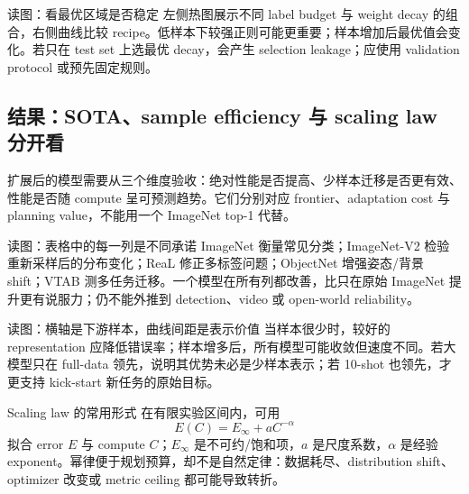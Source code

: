 \begin{knowledgebox}{读图：看最优区域是否稳定}
左侧热图展示不同 label budget 与 weight decay 的组合，右侧曲线比较 recipe。低样本下较强正则可能更重要；样本增加后最优值会变化。若只在 test set 上选最优 decay，会产生 selection leakage；应使用 validation protocol 或预先固定规则。
\end{knowledgebox}

\subsection{结果：SOTA、sample efficiency 与 scaling law 分开看}

扩展后的模型需要从三个维度验收：绝对性能是否提高、少样本迁移是否更有效、性能是否随 compute 呈可预测趋势。它们分别对应 frontier、adaptation cost 与 planning value，不能用一个 ImageNet top-1 代替。


\begin{knowledgebox}{读图：表格中的每一列是不同承诺}
ImageNet 衡量常见分类；ImageNet-V2 检验重新采样后的分布变化；ReaL 修正多标签问题；ObjectNet 增强姿态/背景 shift；VTAB 测多任务迁移。一个模型在所有列都改善，比只在原始 ImageNet 提升更有说服力；仍不能外推到 detection、video 或 open-world reliability。
\end{knowledgebox}


\begin{knowledgebox}{读图：横轴是下游样本，曲线间距是表示价值}
当样本很少时，较好的 representation 应降低错误率；样本增多后，所有模型可能收敛但速度不同。若大模型只在 full-data 领先，说明其优势未必是少样本表示；若 10-shot 也领先，才更支持 kick-start 新任务的原始目标。
\end{knowledgebox}


\begin{importantbox}{Scaling law 的常用形式}
在有限实验区间内，可用
\[
E(C)=E_{\infty}+aC^{-\alpha}
\]
拟合 error $E$ 与 compute $C$；$E_{\infty}$ 是不可约/饱和项，$a$ 是尺度系数，$\alpha$ 是经验 exponent。幂律便于规划预算，却不是自然定律：数据耗尽、distribution shift、optimizer 改变或 metric ceiling 都可能导致转折。
\end{importantbox}

